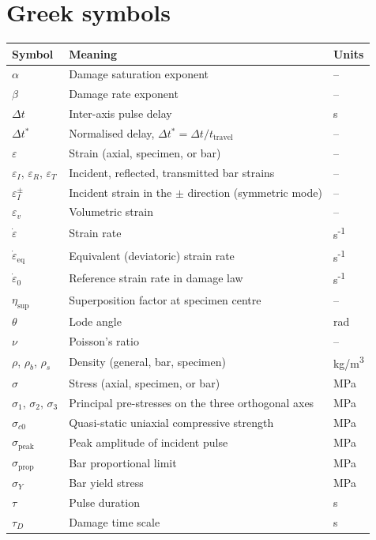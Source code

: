 \documentclass[11pt,a4paper,openany]{book}
\theoremstyle{handbook}
\newcommand{\sig}{\sigma}
\newcommand{\eps}{\varepsilon}
\newcommand{\epsdot}{\dot\eps}
\newcommand{\sigprop}{\sig_{\text{prop}}}
\newcommand{\sigpeak}{\sig_{\text{peak}}}
\begin{document}
\section*{Greek symbols}
\begingroup
\setlength{\parskip}{0pt}
\begin{tabular}{@{}p{3.2cm}p{10cm}p{2cm}@{}}
\toprule
\textbf{Symbol} & \textbf{Meaning} & \textbf{Units} \\
\midrule
$\alpha$ & Damage saturation exponent & -- \\
$\beta$ & Damage rate exponent & -- \\
$\Delta t$ & Inter-axis pulse delay & s \\
$\Delta t^\ast$ & Normalised delay, $\Delta t^\ast=\Delta t/t_{\text{travel}}$ & -- \\
$\eps$ & Strain (axial, specimen, or bar) & -- \\
$\eps_I,\,\eps_R,\,\eps_T$ & Incident, reflected, transmitted bar strains & -- \\
$\eps_I^{\pm}$ & Incident strain in the $\pm$ direction (symmetric mode) & -- \\
$\eps_v$ & Volumetric strain & -- \\
$\epsdot$ & Strain rate & s\textsuperscript{-1} \\
$\epsdot_{\text{eq}}$ & Equivalent (deviatoric) strain rate & s\textsuperscript{-1} \\
$\epsdot_0$ & Reference strain rate in damage law & s\textsuperscript{-1} \\
$\eta_{\text{sup}}$ & Superposition factor at specimen centre & -- \\
$\theta$ & Lode angle & rad \\
$\nu$ & Poisson's ratio & -- \\
$\rho$, $\rho_b$, $\rho_s$ & Density (general, bar, specimen) & kg/m\textsuperscript{3} \\
$\sig$ & Stress (axial, specimen, or bar) & MPa \\
$\sig_1,\,\sig_2,\,\sig_3$ & Principal pre-stresses on the three orthogonal axes & MPa \\
$\sig_{c0}$ & Quasi-static uniaxial compressive strength & MPa \\
$\sigpeak$ & Peak amplitude of incident pulse & MPa \\
$\sigprop$ & Bar proportional limit & MPa \\
$\sig_Y$ & Bar yield stress & MPa \\
$\tau$ & Pulse duration & s \\
$\tau_D$ & Damage time scale & s \\
\bottomrule
\end{tabular}
\endgroup
\end{document}
